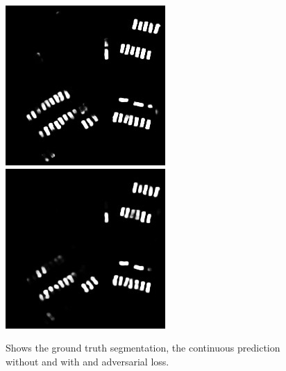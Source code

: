 \documentclass{kththesis}
\begin{document}
\begin{figure}[H]
  \includegraphics[width=\linewidth]{gan_vs_class/class_2}
\endminipage\hfill
{}%
  \includegraphics[width=\linewidth]{gan_vs_class/gan_2}
\endminipage
\caption{Shows the ground truth segmentation, the continuous prediction without and with and adversarial loss.}
\end{figure}
\end{document}
